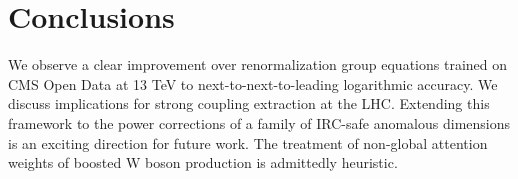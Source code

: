 \section{Conclusions}\label{sec:conclusions}

We observe a clear improvement over renormalization group equations
trained on CMS Open Data at 13 TeV to next-to-next-to-leading
logarithmic accuracy. We discuss implications for strong coupling
extraction at the LHC. Extending this framework to the power corrections
of a family of IRC-safe anomalous dimensions is an exciting direction
for future work. The treatment of non-global attention weights of
boosted W boson production is admittedly heuristic.

